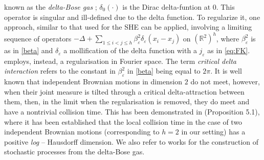 \documentclass[a4paper,reqno,11pt]{amsart}
\numberwithin{equation}{section}
\theoremstyle{mytheorem}
\newcommand{\R}{\mathbb{R}}
\renewcommand{\epsilon}{\varepsilon}
\begin{document}
  known as the {\it delta-Bose gas} \cite{AFHKKL92, DFT94, DR04}; $\delta_0(\cdot)$ 
  is the  Dirac delta-funtion at $0$.
  This operator is singular and ill-defined due to the delta function. To regularize it, one approach, similar 
  to that used for the SHE can be applied, involving a limiting sequence of operators
  $-\Delta+\sum_{1\leq i<j\leq h} \beta_\epsilon^2 \delta_\epsilon(x_i-x_j)$ on $(\R^2)^h$, 
  where $\beta_\epsilon^2$ is as in \eqref{beta} and $\delta_\epsilon$ a mollification of the delta function with a $j_\epsilon$ as in \eqref{eq:FK}. \cite{DFT94} employs, instead, a regularisation in Fourier space.
  The term {\it critical delta interaction} refers to the constant in $\beta_\epsilon^2$
  in \eqref{beta}  being equal to $2\pi$.
 It is well known that independent Brownian motions in dimension $2$ do not meet, however, when their joint measure is
 tilted through a critical delta-attraction between them, then, in the limit when the regularisation is removed, they do meet and have a nontrivial collision time.
 This has been demonstrated in \cite{CM24} (Proposition 5.1), 
 where it has been established that the local collision time in the case of
 two independent Brownian motions (corresponding to $h=2$ in our setting) has a positive {\it log} -- Hausdorff dimension.
 We also refer to works \cite{Ch24a, Ch24b, Ch25b, Ch25c, Ch25d} for the construction of stochastic processes
 from the delta-Bose gas. 
 
\end{document}
